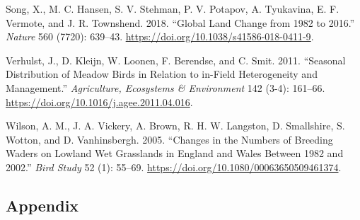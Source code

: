 \documentclass[
  12pt,
  letterpaper,
  DIV=11,
  numbers=noendperiod]{scrartcl}
\newlength{\cslhangindent}
\newenvironment{CSLReferences}[2] %
 {\begin{list}{}{%
  \setlength{\itemindent}{0pt}
  \setlength{\leftmargin}{0pt}
  \setlength{\parsep}{0pt}
  \ifodd #1
   \setlength{\leftmargin}{\cslhangindent}
   \setlength{\itemindent}{-1\cslhangindent}
  \fi
  \setlength{\itemsep}{#2\baselineskip}}}
 {\end{list}}
\begin{document}
\begin{CSLReferences}{1}{0}
Song, X., M. C. Hansen, S. V. Stehman, P. V. Potapov, A. Tyukavina, E.
F. Vermote, and J. R. Townshend. 2018. {``Global Land Change from 1982
to 2016.''} \emph{Nature} 560 (7720): 639--43.
\url{https://doi.org/10.1038/s41586-018-0411-9}.

Verhulst, J., D. Kleijn, W. Loonen, F. Berendse, and C. Smit. 2011.
{``Seasonal Distribution of Meadow Birds in Relation to in-Field
Heterogeneity and Management.''} \emph{Agriculture, Ecosystems \&
Environment} 142 (3-4): 161--66.
\url{https://doi.org/10.1016/j.agee.2011.04.016}.

Wilson, A. M., J. A. Vickery, A. Brown, R. H. W. Langston, D.
Smallshire, S. Wotton, and D. Vanhinsbergh. 2005. {``Changes in the
Numbers of Breeding Waders on Lowland Wet Grasslands in England and
Wales Between 1982 and 2002.''} \emph{Bird Study} 52 (1): 55--69.
\url{https://doi.org/10.1080/00063650509461374}.

\end{CSLReferences}

\newpage{}

\subsection{Appendix}\label{appendix}

\beginsupplement

\newpage{}

\begingroup\fontsize{7}{9}\selectfont
\end{document}
